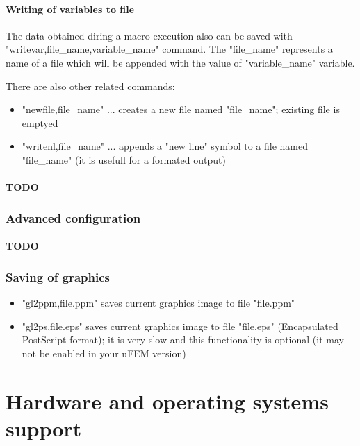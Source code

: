\documentclass{article}
\begin{document}
\paragraph{Writing of variables to file}

 The data obtained diring a macro execution also can be
 saved with "writevar,file\_name,variable\_name" command.
 The "file\_name" represents a name of a file which will
 be  appended with the value of "variable\_name" variable.

 There are also other related commands:


\begin{itemize}
\item  "newfile,file\_name" ... creates a new file named "file\_name"; existing file is emptyed
\item  "writenl,file\_name" ... appends a "new line" symbol to a file named "file\_name" (it is usefull for a formated output)
\end{itemize}

\paragraph{TODO}

\subsubsection{Advanced configuration}

\paragraph{TODO}

\subsubsection{Saving of graphics}
\begin{itemize}
\item  "gl2ppm,file.ppm" saves current graphics image to file "file.ppm"
\item  "gl2ps,file.eps" saves current graphics image to file "file.eps" (Encapsulated PostScript format); it is very slow and this functionality is optional (it may not be enabled in your uFEM version)
\end{itemize}

\section{Hardware and operating systems support	}
\end{document}
